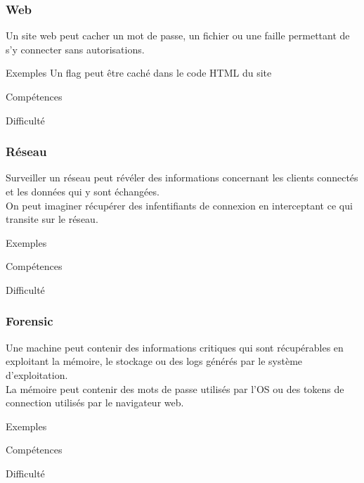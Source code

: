 \documentclass{beamer}
\begin{document}
\begin{frame}
\frametitle{Web}

Un site web peut cacher un mot de passe, un fichier ou une faille permettant de s'y connecter sans autorisations.

\begin{block}{Exemples}
    Un flag peut être caché dans le code HTML du site
\end{block}

\begin{block}{Compétences}
\end{block}

\begin{block}{Difficulté}
\end{block}

\end{frame}


\begin{frame}
\frametitle{Réseau}

Surveiller un réseau peut révéler des informations concernant les clients connectés et les données qui y sont échangées. \\
On peut imaginer récupérer des infentifiants de connexion en interceptant ce qui transite sur le réseau. 

\begin{block}{Exemples}
\end{block}

\begin{block}{Compétences}
\end{block}

\begin{block}{Difficulté}
\end{block}

\end{frame}


\begin{frame}
\frametitle{Forensic}

Une machine peut contenir des informations critiques qui sont récupérables en exploitant la mémoire, le stockage ou des logs générés par le système d'exploitation. \\
La mémoire peut contenir des mots de passe utilisés par l'OS ou des tokens de connection utilisés par le navigateur web.

\begin{block}{Exemples}
\end{block}

\begin{block}{Compétences}
\end{block}

\begin{block}{Difficulté}
\end{block}

\end{frame}
\end{document}
